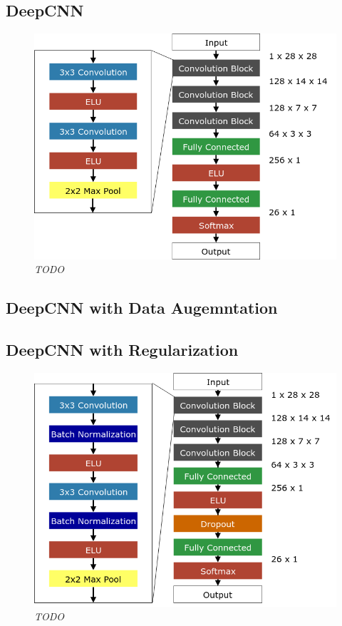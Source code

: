 \documentclass[a4paper]{article}
\begin{document}
\subsection{DeepCNN}
\begin{figure}
     \centering
     \includegraphics[height=0.7\linewidth]{graphics/nets/CNN13}
     \caption{\textit{TODO}}
     \label{fig:deepCNN}
\end{figure}

\subsection{DeepCNN with Data Augemntation}

\subsection{DeepCNN with Regularization}
\begin{figure}
     \centering
     \includegraphics[height=0.7\linewidth]{graphics/nets/CNN13_with_BN}
     \caption{\textit{TODO}}
     \label{fig:deepCNN_regular}
\end{figure}
\end{document}
